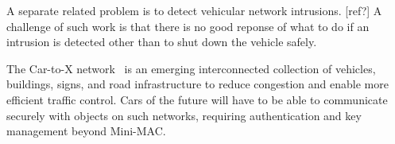A separate related problem is to detect vehicular network intrusions. [ref?]  A challenge of such work is that
there is no good reponse of what to do if an intrusion is detected other than to shut down the vehicle safely.

The Car-to-X network~\cite{C2X} is an emerging interconnected collection of vehicles, buildings, signs, and road infrastructure 
to reduce congestion and enable more efficient traffic control. Cars of the future will have to be able to communicate
securely with objects on such networks, requiring authentication and key management beyond Mini-MAC.


